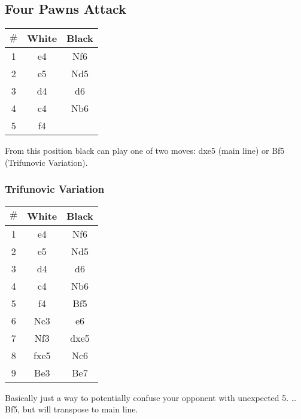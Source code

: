 \documentclass{article}
\newcommand{\smalls}{\par\smallskip}
\begin{document}
    \subsection*{Four Pawns Attack}
        \newgame
        \begin{multicols}{2}
            \showboard
            \smalls
            \begin{tabular}{c|c|c}
            $\#$ & White & Black\\
            \hline
            1 & e4 & Nf6 \\
            2 & e5 & Nd5 \\
            3 & d4 & d6 \\
            4 & c4 & Nb6 \\
            5 & f4 & \\
        \end{tabular}
        \end{multicols}
        From this position black can play one of two moves: dxe5 (main line) or
        Bf5 (Trifunovic Variation).


        \subsubsection*{Trifunovic Variation}
        \begin{multicols}{2}
            \showboard
            \smalls
            \begin{tabular}{c|c|c}
                $\#$ & White & Black\\
                \hline
                1 & e4 & Nf6 \\
                2 & e5 & Nd5 \\
                3 & d4 & d6 \\
                4 & c4 & Nb6 \\
                5 & f4 & Bf5 \\
                6 & Nc3 & e6 \\
                7 & Nf3 & dxe5 \\
                8 & fxe5 & Nc6 \\
                9 & Be3 & Be7 \\
            \end{tabular}
        \end{multicols}
        Basically just a way to potentially confuse your opponent with
        unexpected 5. \dots Bf5, but will transpose to main line.
\end{document}
